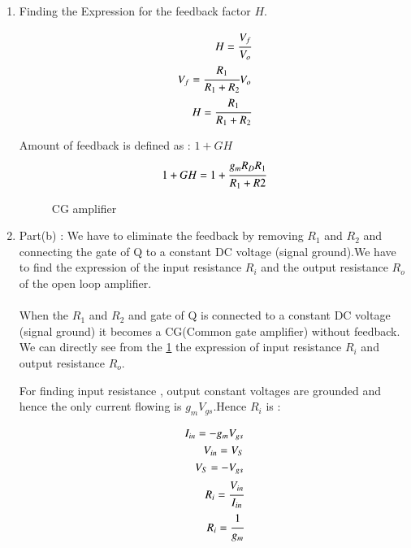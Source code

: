 \begin{enumerate}[label=\thesubsection.\arabic*.,ref=\thesubsection.\theenumi]
\item Finding the Expression for the feedback factor $H$.\\
\solution

\begin{align}
H = \cfrac{V_{f}}{V_{o}}\\
V_{f} = \cfrac{R_{1}}{R_{1}+R_{2}}V_{o}\\
H = \cfrac{R_{1}}{R_{1}+R_{2}}
\end{align}


Amount of feedback is defined as : $1+GH$
\begin{align}
1+GH = 1 + \cfrac{g_{m}R_{D}R_{1}}{R_{1}+R{2}} 
\end{align}



\begin{figure}[h!]
	\begin{center}
		\resizebox{\columnwidth/1}{!}{}
	\end{center}
	\caption{CG amplifier}
	\label{fig:CG amplifier}
\end{figure}

\item Part(b) : We have to eliminate the feedback by removing $R_{1}$ and $R_{2}$ and connecting the gate of Q to a constant DC voltage (signal ground).We have to find the expression of the input resistance  $R_{i}$ and the output resistance $R_{o}$ of the open loop amplifier.\\
\solution\\
When the $R_{1}$ and $R_{2}$ and gate of Q is connected to a constant DC voltage (signal ground) it becomes a CG(Common gate amplifier) without feedback.
We can directly see from the \ref{fig:CG amplifier} the expression of input resistance $R_{i}$ and output resistance $R_{o}$.


For finding input resistance , output constant voltages are grounded and hence the only current flowing is $g_{m}V_{gs}$.Hence $R_{i}$ is :



\begin{align}
I_{in} = -g_{m}V_{gs}\\
V_{in} = V_{S}\\
V_{S} = -V_{gs}\\
R_{i} = \cfrac{V_{in}}{I_{in}}\\
R_{i} = \cfrac{1}{g_{m}}
\end{align}


\end{enumerate}
